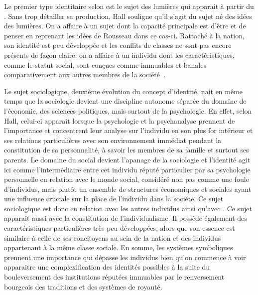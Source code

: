 Le premier type identitaire selon \citeauthor{Hall1996a} est le sujet des lumières qui apparait à partir du . 
Sans trop détailler sa production, Hall souligne qu'il s'agit du sujet né des idées des lumières. 
On a affaire à un sujet dont la capacité principale est d'être et de penser en reprenant les idées de Rousseau dans ce cas-ci. 
Rattaché à la nation, son identité est peu développée et les conflits de classes ne sont pas encore présents de façon claire: on a affaire à un individu dont les caractéristiques, comme le statut social, sont conçues comme immuables et banales comparativement aux autres membres de la société~\citeyearpar[596]{Hall1996a}.

Le sujet sociologique, deuxième évolution du concept d'identité, nait en même temps que la sociologie devient une discipline autonome séparée du domaine de l'économie, des sciences politiques, mais surtout de la psychologie. 
En effet, selon Hall, celui-ci apparait lorsque la psychologie et la psychanalyse prennent de l'importance et concentrent leur analyse sur l'individu en son plus for intérieur et ses relations particulières avec son environnement immédiat pendant la constitution de sa personnalité, à savoir les membres de sa famille et surtout ses parents. 
Le domaine du social devient l'apanage de la sociologie et l'identité agit ici comme l'intermédiaire entre cet individu réputé particulier par sa psychologie personnelle en relation avec le monde social, considéré non pas comme une foule d'individus, mais plutôt un ensemble de structures économiques et sociales ayant une influence cruciale sur la place de l'individu dans la société. 
Ce sujet sociologique est donc en relation avec les autres individus ainsi qu'avec . 
Ce sujet apparait aussi avec la constitution de l'individualisme. 
Il possède également des caractéristiques particulières très peu développées, alors que son essence est similaire à celle de ses concitoyens au sein de la nation et des individus appartenant à la même classe sociale. 
En somme, les systèmes symboliques prennent une importance qui dépasse les individus bien qu'on commence à voir apparaitre une complexification des identités possibles à la suite du bouleversement des institutions réputées immuables par le renversement bourgeois des traditions et des systèmes de royauté. 

